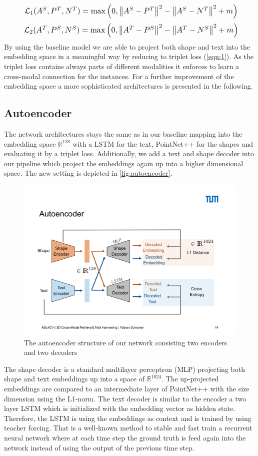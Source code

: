 \documentclass[10pt,twocolumn,letterpaper]{article}
\begin{document}
\begin{equation}
	\label{eqn:2}
	\resizebox{.9 \linewidth}{!}
	{ $
	\mathcal{L}_1(A^S, P^T, N^T) = \max \left( 0, \left\Vert A^S - P^T\right\Vert^2 - \left\Vert A^S - N^T\right\Vert^2 +m \right) $}
\end{equation}
\begin{equation}
\label{eqn:3}
\resizebox{.9 \linewidth}{!}
{ $
	\mathcal{L}_2(A^T, P^S, N^S) = \max \left( 0, \left\Vert A^T - P^S\right\Vert^2 - \left\Vert A^T - N^S\right\Vert^2 +m \right) $}
\end{equation}
By using the baseline model we are able to project both shape and text into the embedding space in a meaningful way by reducing to triplet loss (\ref{eqn:1}). As the triplet loss contains always parts of different modalities it enforces to learn a cross-modal connection for the instances. For a further improvement of the embedding space a more sophisticated architectures is presented in the following.

\subsection{Autoencoder}
The network architectures stays the same as in our baseline mapping into the embedding space $\mathbb{R}^{128}$ with a LSTM for the text, PointNet++ for the shapes and evaluating it by a triplet loss. Additionally, we add a text and shape decoder into our pipeline which project the embeddings again up into a higher dimensional space. The new setting is depicted in \autoref{fig:autoencoder}.
\begin{figure}[t]%
	\centering
	\includegraphics[width=0.8\linewidth]{fig4.pdf}
	\caption[]{The autoencoder structure of our network consisting two encoders and two decoders}
	\label{fig:autoencoder}
\end{figure}
The shape decoder is a standard multilayer perceptron (MLP) projecting both shape and text embeddings up into a space of $\mathbb{R}^{1024}$. The up-projected embeddings are compared to an intermediate layer of PointNet++ with the size dimension using the L1-norm. The text decoder is similar to the encoder a two layer LSTM which is initialized with the embedding vector as hidden state. Therefore, the LSTM is using the embeddings as context and is trained by using teacher forcing. That is a well-known method to stable and fast train a recurrent neural network where at each time step the ground truth is feed again into the network instead of using the output of the previous time step.
\end{document}
